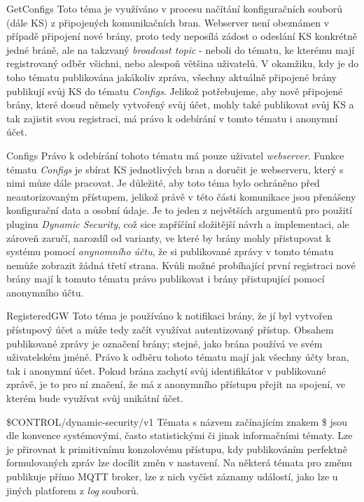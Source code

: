 \def\myprefix{}
\begin{enumnonum}[style=nextline]
    \item[GetConfigs]
    Toto téma je využíváno v procesu načítání konfiguračních souborů (dále KS) z připojených komunikačních bran. Webserver není obeznámen v případě připojení nové brány, proto tedy neposílá zádost o odeslání KS konkrétně jedné bráně, ale na takzvaný \emph{broadcast topic} - neboli do tématu, ke kterému mají registrovaný odběr všichni, nebo alespoň většina uživatelů. V okamžiku, kdy je do toho tématu publikována jakákoliv zpráva, všechny aktuálně připojené brány publikují svůj KS do tématu \emph{Configs}. Jelikož potřebujeme, aby nově připojené brány, které dosud němely vytvořený svůj účet, mohly také publikovat svůj KS a tak zajistit svou registraci, má právo k odebírání v tomto tématu i anonymní účet.
    \item[Configs]
    Právo k odebírání tohoto tématu má pouze uživatel \emph{webserver}. Funkce tématu \emph{Configs} je sbírat KS jednotlivých bran a doručit je webserveru, který s nimi můze dále pracovat. Je důležité, aby toto téma bylo ochráněno před neautorizovaným přístupem, jelikož právě v této části komunikace jsou přenášeny konfigurační data a osobní údaje. Je to jeden z největších argumentů pro použití pluginu \emph{Dynamic Security}, což sice zapříčíní složitější návrh a implementaci, ale zároveň zaručí, narozdíl od varianty, ve které by brány mohly přistupovat k systému pomocí \emph{anynomního účtu}, že si publikované zprávy v tomto tématu nemůže zobrazit žádná třetí strana. Kvůli možné probíhající první registraci nové brány mají k tomuto tématu právo publikovat i brány přistupující pomocí anonymního účtu.
    \item[RegisteredGW]
    Toto téma je používáno k notifikaci brány, že jí byl vytvořen přístupový účet a může tedy začít využívat autentizovaný přístup. Obsahem publikované zprávy je označení brány; stejné, jako brána používá ve svém uživatelském jméně. Právo k odběru tohoto tématu mají jak všechny účty bran, tak i anonymní účet. Pokud brána zachytí svůj identifikátor v publikované zprávě, je to pro ní značení, že má z anonymního přístupu přejít na spojení, ve kterém bude využívat svůj unikátní účet.
    \item[\$CONTROL/dynamic-security/v1]
    Témata s názvem začínajícím znakem \$ jsou dle konvence systémovými, často statistickými či jinak informačními tématy. Lze je přirovnat k primitivnímu konzolovému přístupu, kdy publikováním perfektně formulovaných zpráv lze docílit změn v nastavení. Na některá témata pro změnu publikuje přímo MQTT broker, lze z nich vyčíst záznamy událostí, jako lze u jiných platforem z \emph{log} souborů.
\end{enumnonum}

